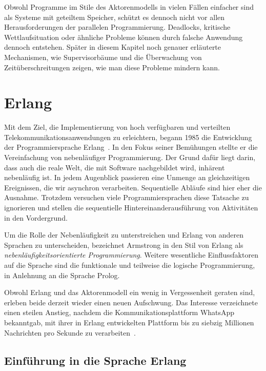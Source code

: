 Obwohl Programme im Stile des Aktorenmodells in vielen Fällen einfacher sind als Systeme mit geteiltem Speicher, schützt es dennoch nicht vor allen Herausforderungen der parallelen Programmierung. Deadlocks, kritische Wettlaufsituation oder ähnliche Probleme können durch falsche Anwendung dennoch entstehen. Später in diesem Kapitel noch genauer erläuterte Mechanismen, wie Supervisorbäume und die Überwachung von Zeitüberschreitungen zeigen, wie man diese Probleme mindern kann.

\section{Erlang}
\label{sec:erlang}

Mit dem Ziel, die Implementierung von hoch verfügbaren und verteilten Telekommunikationsanwendungen zu erleichtern, begann \citeauthor{Armstrong:1997:DE:258948.258967} 1985 die Entwicklung der Programmiersprache Erlang~\cite{Armstrong:1997:DE:258948.258967}. In den Fokus seiner Bemühungen stellte er die Vereinfachung von nebenläufiger Programmierung. Der Grund dafür liegt darin, dass auch die reale Welt, die mit Software nachgebildet wird, inhärent nebenläufig ist. In jedem Augenblick passieren eine Unmenge an gleichzeitigen Ereignissen, die wir asynchron verarbeiten. Sequentielle Abläufe sind hier eher die Ausnahme. Trotzdem versuchen viele Programmiersprachen diese Tatsache zu ignorieren und stellen die sequentielle Hintereinanderausführung von Aktivitäten in den Vordergrund.

Um die Rolle der Nebenläufigkeit zu unterstreichen und Erlang von anderen Sprachen zu unterscheiden, bezeichnet Armstrong in \cite[19]{armstrong03} den Stil von Erlang als \textit{nebenläufigkeitsorientierte Programmierung}. Weitere wesentliche Einflussfaktoren auf die Sprache sind die funktionale und teilweise die logische Programmierung, in Anlehnung an die Sprache Prolog.

Obwohl Erlang und das Aktorenmodell ein wenig in Vergessenheit geraten sind, erleben beide derzeit wieder einen neuen Aufschwung. Das Interesse verzeichnete einen steilen Anstieg, nachdem die Kommunikationsplattform WhatsApp bekanntgab, mit ihrer in Erlang entwickelten Plattform bis zu siebzig Millionen Nachrichten pro Sekunde zu verarbeiten~\cite{ErlangWhatsApp}.

\subsection{Einführung in die Sprache Erlang}

